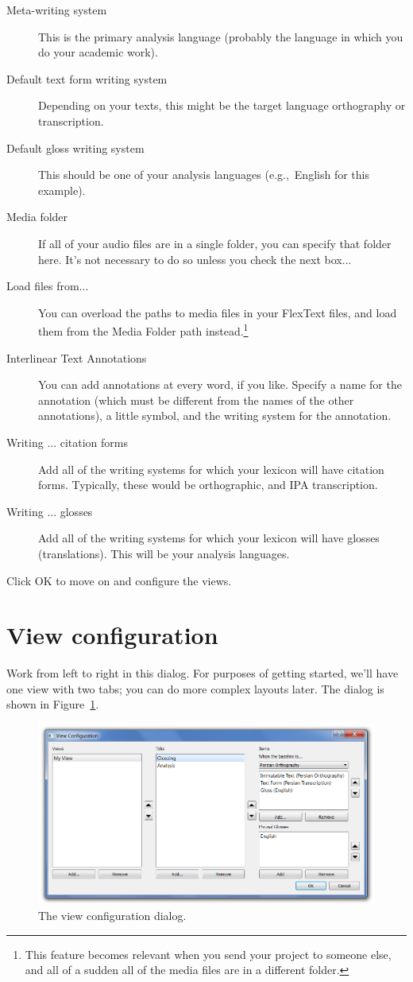 \documentclass[oneside]{book}
\def\eg{e.g.,~}
\def\fig#1{Figure~\ref{#1}}
\begin{document}
\begin{description}
\item[Meta-writing system] This is the primary analysis language (probably the language in which you do your academic work).
\item[Default text form writing system] Depending on your texts, this might be the target language orthography or transcription.
\item[Default gloss writing system] This should be one of your analysis languages (\eg English for this example).
\item[Media folder] If all of your audio files are in a single folder, you can specify that folder here. It's not necessary to do so unless you check the next box...
\item[Load files from...] You can overload the paths to media files in your FlexText files, and load them from the Media Folder path instead.\footnote{This feature becomes relevant when you send your project to someone else, and all of a sudden all of the media files are in a different folder.}
\item[Interlinear Text Annotations] You can add annotations at every word, if you like. Specify a name for the annotation (which must be different from the names of the other annotations), a little symbol, and the writing system for the annotation.
\item[Writing ... citation forms] Add all of the writing systems for which your lexicon will have citation forms. Typically, these would be orthographic, and IPA transcription.
\item[Writing ... glosses] Add all of the writing systems for which your lexicon will have glosses (translations). This will be your analysis languages.
\end{description}
Click OK to move on and configure the views.

\section{View configuration}\label{sect:views}
Work from left to right in this dialog. For purposes of getting started, we'll have one view with two tabs; you can do more complex layouts later. The dialog is shown in \fig{fig:view}.

\begin{figure}
\includegraphics[width=\textwidth]{view-configuration.png}
\caption{The view configuration dialog.}\label{fig:view}
\end{figure}
\end{document}

